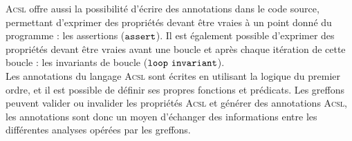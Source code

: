 \textsc{Acsl} offre aussi la possibilité d'écrire des annotations dans le code
source, permettant d'exprimer des propriétés devant être vraies à un point donné
du programme : les assertions (${\tt assert}$).
Il est également possible d'exprimer des propriétés devant être vraies avant une
boucle et après chaque itération de cette boucle : les invariants de boucle
(${\tt loop\ invariant}$).\\


Les annotations du langage \textsc{Acsl} sont écrites en utilisant la logique
du premier ordre, et il est possible de définir ses propres fonctions et
prédicats.
Les greffons peuvent valider ou invalider les propriétés \textsc{Acsl} et
générer des annotations \textsc{Acsl}, les annotations sont donc un moyen
d'échanger des informations entre les différentes analyses opérées par les
greffons.
